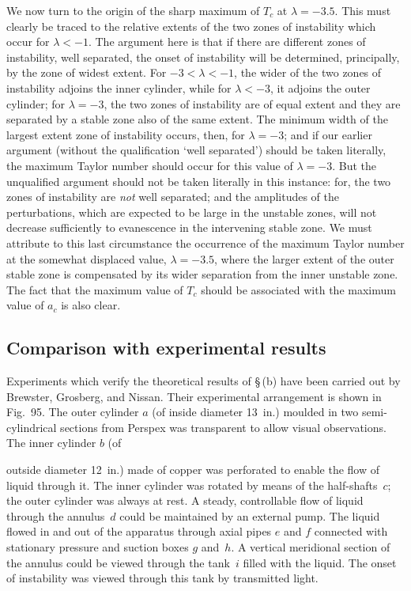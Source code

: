 We now turn to the origin of the sharp maximum of $T_c$ at $\lambda = -3.5$. This must clearly be traced to the relative extents of the two zones of instability which occur for $\lambda < -1$. The argument here is that if there are different zones of instability, well separated, the onset of instability will be determined, principally, by the zone of widest extent. For $-3 < \lambda < -1$, the wider of the two zones of instability adjoins the inner cylinder, while for $\lambda < -3$, it adjoins the outer cylinder; for $\lambda = -3$, the two zones of instability are of equal extent and they are separated by a stable zone also of the same extent. The minimum width of the largest extent zone of instability occurs, then, for $\lambda = -3$; and if our earlier argument (without the qualification `well separated') should be taken literally, the maximum Taylor number should occur for this value of $\lambda = -3$. But the unqualified argument should not be taken literally in this instance: for, the two zones of instability are \emph{not} well separated; and the amplitudes of the perturbations, which are expected to be large in the unstable zones, will not decrease sufficiently to evanescence in the intervening stable zone. We must attribute to this last circumstance the occurrence of the maximum Taylor number at the somewhat displaced value, $\lambda = -3.5$, where the larger extent of the outer stable zone is compensated by its wider separation from the inner unstable zone. The fact that the maximum value of $T_c$ should be associated with the maximum value of $a_c$ is also clear.

\subsection{Comparison with experimental results}
\label{sec:77d}

Experiments which verify the theoretical results of \S\,(b) have been carried out by Brewster, Grosberg, and Nissan. Their experimental arrangement is shown in Fig.~95. The outer cylinder $a$ (of inside diameter 13~in.) moulded in two semi-cylindrical sections from Perspex was transparent to allow visual observations. The inner cylinder $b$ (of


outside diameter 12~in.) made of copper was perforated to enable the flow of liquid through it. The inner cylinder was rotated by means of the half-shafts~$c$; the outer cylinder was always at rest. A steady, controllable flow of liquid through the annulus~$d$ could be maintained by an external pump. The liquid flowed in and out of the apparatus through axial pipes $e$ and $f$ connected with stationary pressure and suction boxes $g$ and~$h$. A vertical meridional section of the annulus could be viewed through the tank~$i$ filled with the liquid. The onset of instability was viewed through this tank by transmitted light.

